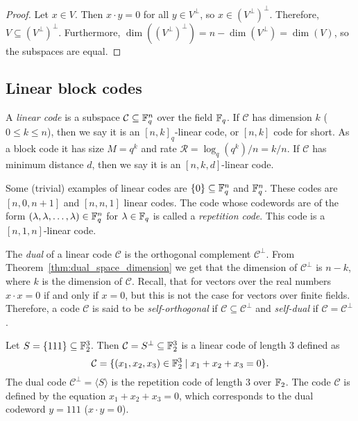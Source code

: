 \documentclass[../main.tex]{subfiles}
\begin{document}
\begin{proof}
Let $x \in V$. Then $x \cdot y = 0$ for all $y \in V^\perp$, so $x \in (V^\perp)^\perp$. Therefore, $V \subseteq (V^\perp)^\perp$. Furthermore, $\dim((V^\perp)^\perp) = n - \dim(V^\perp) = \dim(V)$, so the subspaces are equal.
\end{proof}

\subsection{Linear block codes}

A \emph{linear code} is a subspace $\mathcal{C} \subseteq \mathbb{F}_q^n$ over the field $\mathbb{F}_q$. If $\mathcal{C}$ has dimension $k$ ($0 \leq k \leq n$), then we say it is an $[n, k]_q$-linear code, or $[n, k]$ code for short. As a block code it has size $M = q^k$ and rate $\mathcal{R} = \log_q(q^k) / n = k / n$. If $\mathcal{C}$ has minimum distance $d$, then we say it is an $[n, k, d]$-linear code.

\begin{example}
Some (trivial) examples of linear codes are $\{0\} \subseteq \mathbb{F}_q^n$ and $\mathbb{F}_q^n$. These codes are $[n, 0, n + 1]$ and $[n, n, 1]$ linear codes. The code whose codewords are of the form $(\lambda, \lambda, \dots, \lambda) \in \mathbb{F}_q^n$ for $\lambda \in \mathbb{F}_q$ is called a \emph{repetition code}. This code is a $[n, 1, n]$-linear code.
\end{example}

The \emph{dual} of a linear code $\mathcal{C}$ is the orthogonal complement $\mathcal{C}^\perp$. From Theorem~\ref{thm:dual_space_dimension} we get that the dimension of $\mathcal{C}^\perp$ is $n - k$, where $k$ is the dimension of $\mathcal{C}$. Recall, that for vectors over the real numbers $x \cdot x = 0$ if and only if $x = 0$, but this is not the case for vectors over finite fields. Therefore, a code $\mathcal{C}$ is said to be \emph{self-orthogonal} if $\mathcal{C} \subseteq \mathcal{C}^\perp$ and \emph{self-dual} if $\mathcal{C} = \mathcal{C}^\perp$.

\begin{example}
Let $S = \{111\} \subseteq \mathbb{F}_2^3$. Then $\mathcal{C} = S^\perp \subseteq \mathbb{F}_2^3$ is a linear code of length $3$ defined as
\begin{equation*}
    \mathcal{C} = \{ (x_1, x_2, x_3) \in \mathbb{F}_2^3 \mid x_1 + x_2 + x_3 = 0 \}.
\end{equation*}
The dual code $\mathcal{C}^\perp = \langle S \rangle$ is the repetition code of length $3$ over $\mathbb{F}_2$. The code $\mathcal{C}$ is defined by the equation $x_1 + x_2 + x_3 = 0$, which corresponds to the dual codeword $y = 111$ ($x \cdot y = 0$).
\end{example}
\end{document}
